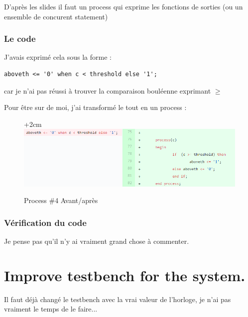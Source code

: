 \documentclass{article}
\begin{document}
D'après les slides il faut un process qui exprime les fonctions de sorties (ou un ensemble de concurent statement)

\subsubsection{Le code}

J'avais exprimé cela sous la forme :
\begin{verbatim}
aboveth <= '0' when c < threshold else '1';
\end{verbatim}

car je n'ai pas réussi à trouver la comparaison bouléenne exprimant $\geq$ 

Pour être sur de moi, j'ai transformé le tout en un process :

\begin{figure}[!h]
\advance\leftskip+2cm
\includegraphics[scale=0.7]{oldProc3.PNG}
\caption{Process \#4 Avant/après }
\end{figure}

\subsubsection{Vérification du code}
	Je pense pas qu'il n'y ai vraiment grand chose à commenter.

\section{Improve testbench for the system.}
Il faut déjà changé le testbench avec la vrai valeur de l'horloge, je n'ai pas vraiment le temps de le faire...
\end{document}
